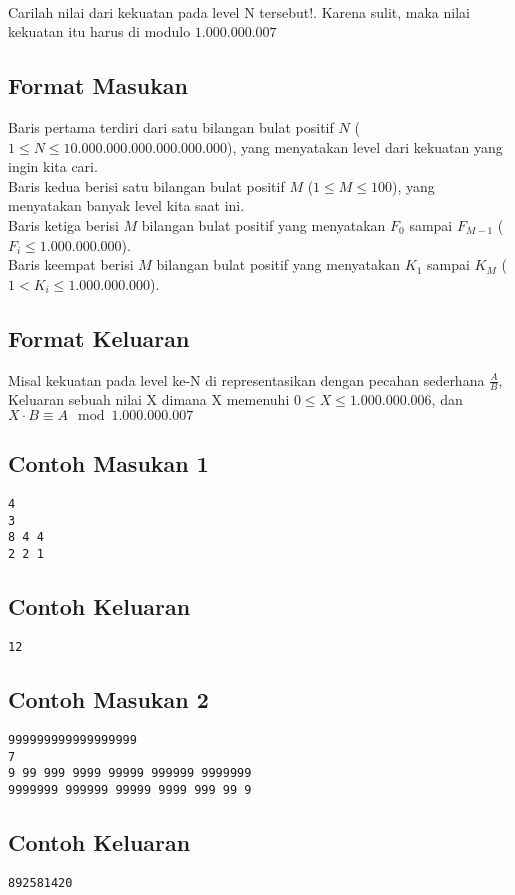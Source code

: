 \documentclass{article}
\begin{document}
\\
Carilah nilai dari kekuatan pada level N tersebut!. Karena sulit, maka nilai kekuatan itu harus di modulo $1.000.000.007$

\subsection*{Format Masukan}

Baris pertama terdiri dari satu bilangan bulat positif $N$ ($1 \leq N \leq 10.000.000.000.000.000.000$), yang menyatakan level dari kekuatan yang ingin kita cari.\\
Baris kedua berisi satu bilangan bulat positif $M$ ($1 \leq M \leq 100$), yang menyatakan banyak level kita saat ini.\\
Baris ketiga berisi $M$ bilangan bulat positif yang menyatakan $F_0$ sampai $F_{M-1}$ ($F_i \leq 1.000.000.000$).\\
Baris keempat berisi $M$ bilangan bulat positif yang menyatakan $K_1$ sampai $K_{M}$ ($ 1 < K_i \leq 1.000.000.000 $).\\

\subsection*{Format Keluaran}

Misal kekuatan pada level ke-N di representasikan dengan pecahan sederhana $\frac{A}{B}$, Keluaran sebuah nilai X dimana X memenuhi $0\leq X \leq 1.000.000.006$, dan $X \cdot B \equiv A \mod 1.000.000.007$
\\

\begin{multicols}{2}
\subsection*{Contoh Masukan 1}
\begin{lstlisting}
4
3
8 4 4
2 2 1
\end{lstlisting}
\columnbreak
\subsection*{Contoh Keluaran}
\begin{lstlisting}
12
\end{lstlisting}
\vfill
\null
\end{multicols}

\begin{multicols}{2}
\subsection*{Contoh Masukan 2}
\begin{lstlisting}
999999999999999999
7
9 99 999 9999 99999 999999 9999999
9999999 999999 99999 9999 999 99 9
\end{lstlisting}
\columnbreak
\subsection*{Contoh Keluaran}
\begin{lstlisting}
892581420
\end{lstlisting}
\vfill
\null
\end{multicols}
\end{document}
